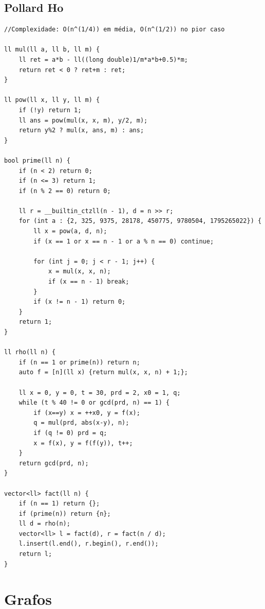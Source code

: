 \documentclass[11pt, a4paper, twoside]{article}
\begin{document}
\subsection{Pollard Ho}
\begin{verbatim}
//Complexidade: O(n^(1/4)) em média, O(n^(1/2)) no pior caso

ll mul(ll a, ll b, ll m) {
	ll ret = a*b - ll((long double)1/m*a*b+0.5)*m;
	return ret < 0 ? ret+m : ret;
}

ll pow(ll x, ll y, ll m) {
	if (!y) return 1;
	ll ans = pow(mul(x, x, m), y/2, m);
	return y%2 ? mul(x, ans, m) : ans;
}

bool prime(ll n) {
	if (n < 2) return 0;
	if (n <= 3) return 1;
	if (n % 2 == 0) return 0;
    
	ll r = __builtin_ctzll(n - 1), d = n >> r;
	for (int a : {2, 325, 9375, 28178, 450775, 9780504, 1795265022}) {
		ll x = pow(a, d, n);
		if (x == 1 or x == n - 1 or a % n == 0) continue;
    		
		for (int j = 0; j < r - 1; j++) {
			x = mul(x, x, n);
			if (x == n - 1) break;
		}
		if (x != n - 1) return 0;
	}
	return 1;
}

ll rho(ll n) {
	if (n == 1 or prime(n)) return n;
	auto f = [n](ll x) {return mul(x, x, n) + 1;};
    
	ll x = 0, y = 0, t = 30, prd = 2, x0 = 1, q;
	while (t % 40 != 0 or gcd(prd, n) == 1) {
		if (x==y) x = ++x0, y = f(x);
		q = mul(prd, abs(x-y), n);
		if (q != 0) prd = q;
		x = f(x), y = f(f(y)), t++;
	}
	return gcd(prd, n);
}

vector<ll> fact(ll n) {
	if (n == 1) return {};
	if (prime(n)) return {n};
	ll d = rho(n);
	vector<ll> l = fact(d), r = fact(n / d);
	l.insert(l.end(), r.begin(), r.end());
	return l;
}
\end{verbatim}



%
%

\section{Grafos}
\end{document}
